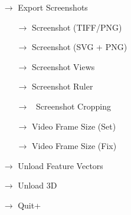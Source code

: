 {\begin{itemize}
\begin{itemize}
\begin{itemize}
  \item[$\rightarrow$] Spherical Stack State No.
  \end{itemize}
   \item[$\rightarrow$] Export Screenshots
  \begin{itemize}
 \item[$\rightarrow$] Screenshot (TIFF/PNG)
 \item[$\rightarrow$] Screenshot (SVG + PNG)
 \item[$\rightarrow$] Screenshot Views
 \item[$\rightarrow$] Screenshot Ruler
 \item[$\rightarrow$]  \checkmark\ Screenshot Cropping
 \item[$\rightarrow$] Video Frame Size (Set)
 \item[$\rightarrow$] Video Frame Size (Fix)
  \end{itemize}
 \item[$\rightarrow$] Unload Feature Vectors
 \item[$\rightarrow$] Unload 3D
 \item[$\rightarrow$] Quit\qquad \Ctrl+
 \end{itemize}
 \end{itemize}
 }

 
